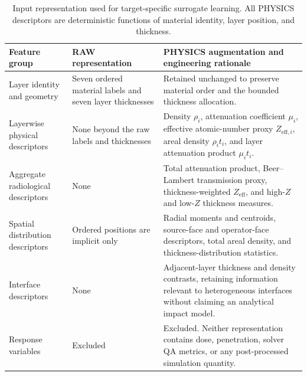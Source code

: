 \documentclass[12pt]{elsarticle}
\newif\ifproductionnotes
\newcommand{\productionnote}[1]{%
\ifproductionnotes
\par\medskip\noindent\fcolorbox{black}{gray!12}{\begin{minipage}{0.94\linewidth}\footnotesize\textbf{Production note for the figure/table designer.} #1\end{minipage}}\par\medskip
\fi}
\begin{document}
	\begin{table}[htbp]
		\centering
		\caption{Input representation used for target-specific surrogate learning. All PHYSICS descriptors are deterministic functions of material identity, layer position, and thickness.}
		\label{tab:features}
		\small
		\begin{tabular}{@{}p{}p{}p{}@{}}
			\toprule
			Feature group & RAW representation & PHYSICS augmentation and engineering rationale \\
			\midrule
			Layer identity and geometry & Seven ordered material labels and seven layer thicknesses & Retained unchanged to preserve material order and the bounded thickness allocation. \\
			Layerwise physical descriptors & None beyond the raw labels and thicknesses & Density $\rho_i$, attenuation coefficient $\mu_i$, effective atomic-number proxy $Z_{\mathrm{eff},i}$, areal density $\rho_i t_i$, and layer attenuation product $\mu_i t_i$. \\
			Aggregate radiological descriptors & None & Total attenuation product, Beer--Lambert transmission proxy, thickness-weighted $Z_{\mathrm{eff}}$, and high-$Z$ and low-$Z$ thickness measures. \\
			Spatial distribution descriptors & Ordered positions are implicit only & Radial moments and centroids, source-face and operator-face descriptors, total areal density, and thickness-distribution statistics. \\
			Interface descriptors & None & Adjacent-layer thickness and density contrasts, retaining information relevant to heterogeneous interfaces without claiming an analytical impact model. \\
			Response variables & Excluded & Excluded. Neither representation contains dose, penetration, solver QA metrics, or any post-processed simulation quantity. \\
			\bottomrule
		\end{tabular}
	\end{table}
	\productionnote{\textbf{Tabela~\ref{tab:features} --- briefing para Carlos.} Refazer como matriz de tr\^es faixas. Colocar os inputs RAW em cinza neutro, os acr\'escimos PHYSICS em azul e a linha ``no response variables'' em cor de seguran\c{c}a contrastante. A fonte obrigat\'oria \`e \texttt{Fase 3/analise\_desempenho\_modelos (Fase 3) - MCNP63/final\_model\_summary.json} e o c\'odigo de \textit{feature engineering} arquivado na Fase 3. N\~ao deduzir defini\c{c}\~oes de features a partir de sa\'idas dos modelos.}
\end{document}
